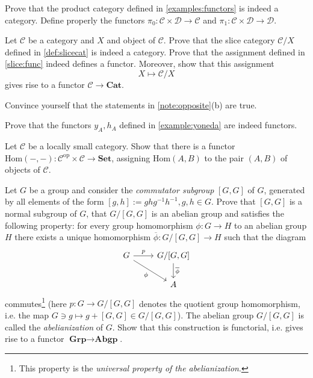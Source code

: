 \documentclass[11pt]{article}
\theoremstyle{plain}
\theoremstyle{definition}
\theoremstyle{remark}
\newcommand{\cC}{\mathcal{C}}
\newcommand{\cD}{\mathcal{D}}
\newcommand{\op}{\mathrm{op}}
\newcommand{\Hom}{\mathrm{Hom}}
\begin{document}
\begin{exercise}\label{exc:prodcat}
Prove that the product category defined in \autoref{examples:functors} is 
indeed a category. Define properly the functors $\pi_{0}:\cC\times\cD\to\cC$
and $\pi_{1}:\cC\times\cD\to\cD$.
\end{exercise}


\begin{exercise}\label{exc:slicecat}
Let $\cC$ be a category and $X$ and object of $\cC$. Prove that the slice category 
$\cC/X$ defined in \autoref{def:slicecat} is indeed a category.
Prove that the assignment defined in \autoref{slice:func} indeed 
defines a functor. Moreover, show that this assignment
\begin{equation*}
    X\mapsto \cC/X
\end{equation*}
gives rise to a functor $\cC\to\textbf{Cat}$.
\end{exercise}


\begin{exercise}\label{exc:oppcat}
Convince yourself that the statements in \autoref{note:opposite}(b) are true.
\end{exercise}

\begin{exercise}\label{exc:yonedafunc}
Prove that the functors $y_{A},h_{A}$ defined in \autoref{example:yoneda} are indeed
functors.
\end{exercise}

\begin{exercise}[$\Hom$ functor] \label{exc:homfunc}
Let $\cC$ be a locally small category. Show that there is a functor 
$\Hom(-,-):\cC^{\op}\times\cC\to\textbf{Set}$, assigning $\Hom(A,B)$
to the pair $(A,B)$ of objects of $\cC$.
\end{exercise}



\begin{exercise} \label{exc:abelianizationfunc}
Let $G$ be a group and consider the {\em commutator subgroup} $[G,G]$ of $G$,
generated by all elements of the form $[g,h]:=ghg^{-1}h^{-1}, g,h\in G$.
Prove that $[G,G]$ is a normal subgroup of $G$, that $G/[G,G]$ is an
abelian group and satisfies the following property: 
for every group homomorphism $\phi:G\to H$ to
an abelian group $H$ there exists a unique homomorphism
$\overline{\phi}:G/[G,G]\to H$ such that the diagram
\begin{equation*}
    \begin{tikzcd}
        G \arrow[r,"p"] \arrow[rd,"\phi"']
        & G/[G,G] \arrow[d,"\overline{\phi}"] \\
        & A
    \end{tikzcd}
\end{equation*}
commutes\footnote{This property is the {\em universal property of the
abelianization}.} (here $p:G\to G/[G,G]$ denotes the quotient group homomorphism,
i.e. the map $G\ni g\mapsto g+[G,G]\in G/[G,G]$). The abelian group
$G/[G,G]$ is called the {\em abelianization} of $G$. Show that this construction
 is functorial, i.e. gives rise to a functor $\textbf{Grp}\to \textbf{Abgp}$.
\end{exercise}
\end{document}
